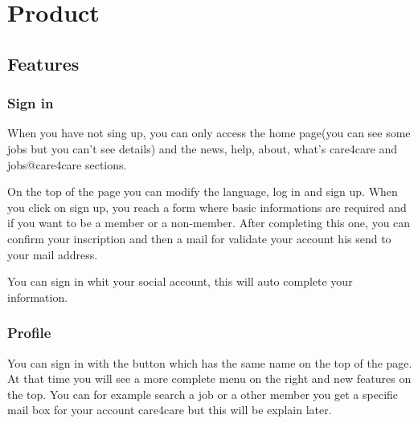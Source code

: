 \documentclass[11pt, a4paper]{article}      %
\begin{document}
\section{Product}

\subsection{Features}

\subsubsection{Sign in}

When you have not sing up, you can only access the home page(you can see some jobs but you can't see details) and the news, help, about, what's care4care and jobs@care4care sections.
\newline

On the top of the page you can modify the language, log in and sign up. When you click on sign up, you reach a form where basic informations are required and if you want to be a member or a non-member. After completing this one, you can confirm your inscription and then a mail for validate your account his send to your mail address.
\newline

You can sign in whit your social account, this will auto complete your information.

\subsubsection{Profile}

You can sign in with the button which has the same name on the top of the page. At that time you will see a more complete menu on the right and new features on the top. You can for example search a job or a other member you get a specific mail box for your account care4care but this will be explain later.
\newline
\end{document}
